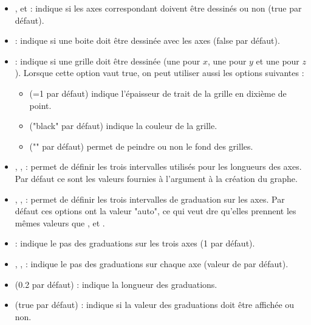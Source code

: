 \begin{itemize}
    \item {},  et  : indique si les axes correspondant doivent être dessinés ou non (true par défaut).

    \item {} : indique si une boite doit être dessinée avec les axes (false par défaut).

    \item {} : indique si une grille doit être dessinée (une pour $x$, une pour $y$ et une pour $z$). Lorsque cette option vaut true, on peut utiliser aussi les options suivantes :
        \begin{itemize}
            \item {} (=1 par défaut) indique l'épaisseur de trait de la grille en dixième de point.
            \item {} ("black" par défaut) indique la couleur de la grille.
            \item {} ("" par défaut) permet de peindre ou non le fond des grilles.
        \end{itemize}
    
    \item {}, ,  : permet de définir les trois intervalles utilisés pour les longueurs des axes. Par défaut ce sont les valeurs fournies à l'argument  à la création du graphe.

    \item {}, ,  : permet de définir les trois intervalles de graduation sur les axes. Par défaut ces options ont la valeur "auto", ce qui veut dre qu'elles prennent les mêmes valeurs que ,  et .
    \item {} : indique le pas des graduations sur les trois axes (1 par défaut).
    \item {}, ,  : indique le pas des graduations sur chaque axe (valeur de  par défaut).

    \item {} (0.2 par défaut) : indique la longueur des graduations.

    \item {} (true par défaut) : indique si la valeur des graduations doit être affichée ou non.
    

\end{itemize}
